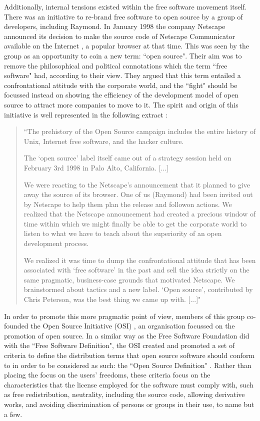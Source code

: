 Additionally, internal tensions existed within the free software movement itself. There was an initiative to re-brand free software to open source by a group of developers, including Raymond. In January 1998 the company Netscape announced its decision to make the source code of Netscape Communicator available on the Internet \parencite{netscape-annoucement:1998:Online}, a popular browser at that time. This was seen by the group as an opportunity to coin a new term: ``open source". Their aim was to remove the philosophical and political connotations which the term ``free software" had, according to their view. They argued that this term entailed a confrontational attitude with the corporate world, and the ``fight" should be focussed instead on showing the efficiency of the development model of open source to attract more companies to move to it. The spirit and origin of this initiative is well represented in the following extract \parencite{osi-history:1998:Online}:

\begin{quotation}
``The prehistory of the Open Source campaign includes the entire history of Unix, Internet free software, and the hacker culture.

The `open source' label itself came out of a strategy session held on February 3rd 1998 in Palo Alto, California. [...]

We were reacting to the Netscape's announcement that it planned to give away the source of its browser. One of us (Raymond) had been invited out by Netscape to help them plan the release and followon actions. We realized that the Netscape announcement had created a precious window of time within which we might finally be able to get the corporate world to listen to what we have to teach about the superiority of an open development process.

We realized it was time to dump the confrontational attitude that has been associated with `free software' in the past and sell the idea strictly on the same pragmatic, business-case grounds that motivated Netscape. We brainstormed about tactics and a new label. `Open source', contributed by Chris Peterson, was the best thing we came up with. [...]"

\end{quotation}

In order to promote this more pragmatic point of view, members of this group co-founded the Open Source Initiative (OSI)  \parencite{osi-history:2014:Online}, an organisation focussed on the promotion of open source. In a similar way as the Free Software Foundation did with the ``Free Software Definition", the OSI created and promoted a set of criteria to define the distribution terms that open source software should conform to in order to be considered as such: the ``Open Source Definition" \parencite{osi-osd:2014:Online}. Rather than placing the focus on the users' freedoms, these criteria focus on the characteristics that the license employed for the software must comply with, such as free redistribution, neutrality, including the source code, allowing derivative works,  and avoiding discrimination of persons or groups in their use, to name but a few.

